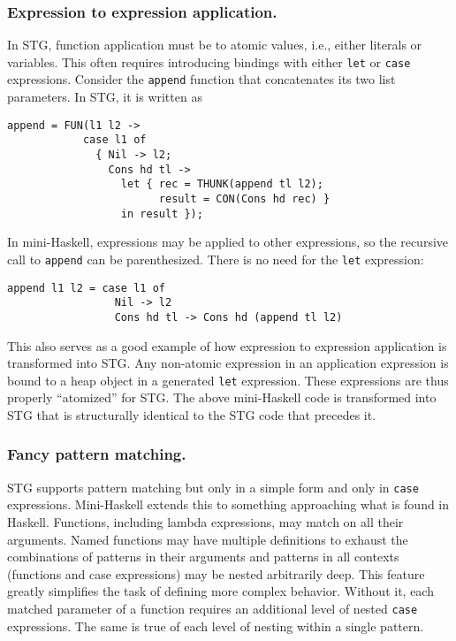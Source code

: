 \documentclass{llncs}
\begin{document}


\subsubsection{Expression to expression application.}

In STG, function application must be to atomic values, i.e., either literals or
variables.  This often requires introducing bindings with either \texttt{let} or
\texttt{case} expressions.  Consider the \texttt{append} function that
concatenates its two list parameters.  In STG, it is written as

\begin{verbatim}
append = FUN(l1 l2 ->
            case l1 of
              { Nil -> l2;
                Cons hd tl -> 
                  let { rec = THUNK(append tl l2);
                        result = CON(Cons hd rec) }
                  in result });
\end{verbatim}
In mini-Haskell, expressions may be applied to other expressions, so the
recursive call to \texttt{append} can be parenthesized. There is no need for the
\texttt{let} expression:
\begin{verbatim}
append l1 l2 = case l1 of
                 Nil -> l2
                 Cons hd tl -> Cons hd (append tl l2)
\end{verbatim}
This also serves as a good example of how expression to expression application is
transformed into STG.  Any non-atomic expression in an application expression is
bound to a heap object in a generated \texttt{let} expression.  These
expressions are thus properly ``atomized'' for STG.  The above mini-Haskell code
is transformed into STG that is structurally identical to the STG code that
precedes it.

\subsubsection{Fancy pattern matching.}

STG supports pattern matching but only in a simple form and only in
\texttt{case} expressions.  Mini-Haskell extends this to something approaching
what is found in Haskell.  Functions, including lambda expressions, may match on
all their arguments. Named functions may have multiple definitions to exhaust
the combinations of patterns in their arguments and patterns in all contexts
(functions and case expressions) may be nested arbitrarily deep.  This feature
greatly simplifies the task of defining more complex behavior.  Without it,
each matched parameter of a function requires an additional level of nested
\texttt{case} expressions. The same is true of each level of nesting within a
single pattern.
\end{document}
